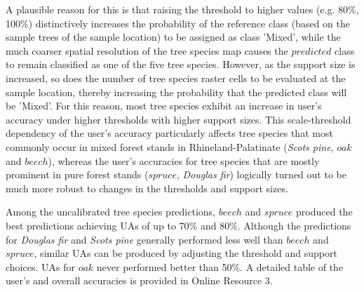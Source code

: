 A plausible reason for this is that raising the threshold to higher values (e.g. 80\%, 100\%) distinctively increases the probability of the reference class (based on the sample trees of the sample location) to be assigned as class 'Mixed', while the much coarser spatial resolution of the tree species map causes the $predicted$ class to remain classified as one of the five tree species. However, as the support size is  increased, so does the number of tree species raster cells to be evaluated at the sample location, thereby increasing the probability that the predicted class will be 'Mixed'. For this reason, most tree species exhibit an increase in user's accuracy under higher thresholds with higher support sizes. This scale-threshold dependency of the user's accuracy particularly affects tree species that most commonly occur in mixed forest stands in Rhineland-Palatinate (\textit{Scots pine}, $oak$ and $beech$), whereas the user's accuracies for tree species that are mostly prominent in pure forest stands ($spruce$, \textit{Douglas fir}) logically turned out to be much more robust to changes in the thresholds and support sizes.\par
Among the uncalibrated tree species predictions, $beech$ and $spruce$ produced the best predictions achieving UAs of up to 70\% and 80\%.  Although the predictions for \textit{Douglas fir} and \textit{Scots pine} generally performed less well than $beech$ and $spruce$, similar UAs can be produced by adjusting the threshold and support choices. UAs for $oak$ never performed better than 50\%. A detailed table of the user's and overall accuracies is provided in Online Resource 3.

